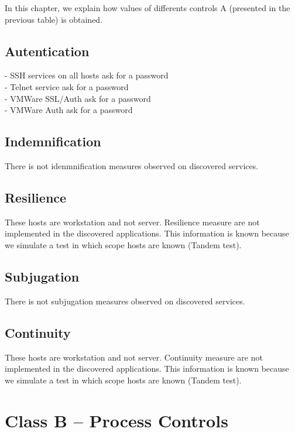 \documentclass[10pt,a4paper,twoside,onecolumn]{article}
\begin{document}
In this chapter, we explain how values of differents controls A (presented in the previous table) is obtained. 

\subsection{Autentication}

- SSH services on all hosts ask for a password\\
- Telnet service ask for a password\\
- VMWare SSL/Auth ask for a password\\
- VMWare Auth ask for a password

\subsection{Indemnification}

There is not idenmnification measures observed on discovered services.

\subsection{Resilience}

These hosts are workstation and not server. Resilience measure are not implemented in the discovered applications. This information is known because we simulate a test in which scope hosts are known (Tandem test).

\subsection{Subjugation}

There is not subjugation measures observed on discovered services.

\subsection{Continuity}

These hosts are workstation and not server. Continuity measure are not implemented in the discovered applications. This information is known because we simulate a test in which scope hosts are known (Tandem test).


\section{Class B -- Process Controls}
\end{document}
